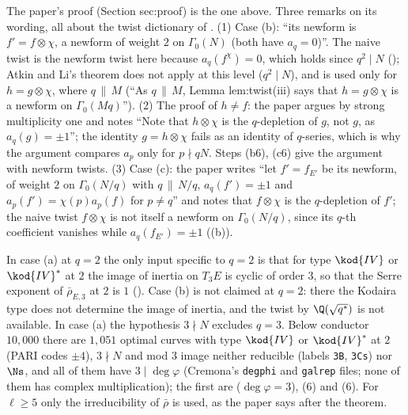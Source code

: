 \begin{paperlink}
The paper's proof (Section sec:proof) is the one above. Three remarks on its wording, all about the twist dictionary of
. (1) Case (b): ``its newform is $f'=f\otimes\chi$, a newform of weight $2$ on $\Gamma_0(N)$ (both have $a_q=0$)''. The naive twist is the newform
twist here because $a_q(f^\chi)=0$, which holds since $q^2\mid N$ (); Atkin and Li's theorem does not apply at this level ($q^2\mid N$), and is
used only for $h=g\otimes\chi$, where $q\,\|\,M$ (``As $q\,\|\,M$, Lemma lem:twist(iii) says that $h=g\otimes\chi$ is a newform on $\Gamma_0(Mq)$''). (2) The proof of $h\ne f$: the
paper argues by strong multiplicity one and notes ``Note that $h\otimes\chi$ is the $q$-depletion of $g$, not $g$, as $a_q(g)=\pm1$''; the identity
$g=h\otimes\chi$ fails as an identity of $q$-series, which is why the argument compares $a_p$ only for $p\nmid qN$. Steps (b6), (c6) give the argument with newform twists. (3) Case (c): the paper writes
``let $f'=f_{E'}$ be its newform, of weight $2$ on $\Gamma_0(N/q)$ with $q\,\|\,N/q$, $a_q(f')=\pm1$ and $a_p(f')=\chi(p)a_p(f)$ for $p\ne q$'' and notes that $f\otimes\chi$ is the $q$-depletion of $f'$; the
naive twist $f\otimes\chi$ is not itself a newform on $\Gamma_0(N/q)$, since its $q$-th coefficient vanishes while $a_q(f_{E'})=\pm1$
((b)).
\end{paperlink}

\begin{remark}[case (a) at $q=2$, and the range of the hypotheses]\label{rem:modgalrep:qual-q2}
In case (a) at $q=2$ the only input specific to $q=2$ is that for type $\kod{IV}$ or $\kod{IV}^*$ at $2$ the image of inertia on $T_3E$ is
cyclic of order $3$, so that the Serre exponent of $\bar\rho_{E,3}$ at $2$ is $1$ (). Case (b) is not claimed at $q=2$: there the Kodaira type does not
determine the image of inertia, and the twist by $\Q(\sqrt{q^*})$ is not available. In case (a) the hypothesis $3\nmid N$ excludes $q=3$. Below conductor $10{,}000$ there
are $1{,}051$ optimal curves with type $\kod{IV}$ or $\kod{IV}^*$ at $2$ (PARI codes $\pm4$), $3\nmid N$ and mod $3$ image neither reducible (labels \texttt{3B}, \texttt{3Cs}) nor $\Ns$, and
all of them have $3\mid\deg\varphi$ (Cremona's \texttt{degphi} and \texttt{galrep} files; none of them has complex multiplication); the first are  ($\deg\varphi=3$),
 ($6$) and  ($6$). For $\ell\ge5$ only the irreducibility of $\bar\rho$ is used, as the paper says after the theorem.
\end{remark}

